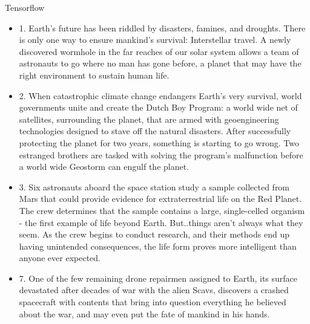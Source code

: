 Tensorflow
\begin{itemize}
    \item 1. Earth's future has been riddled by disasters, famines, and droughts. There is only one way to ensure mankind's survival: Interstellar travel. A newly discovered wormhole in the far reaches of our solar system allows a team of astronauts to go where no man has gone before, a planet that may have the right environment to sustain human life.
    \item 2. When catastrophic climate change endangers Earth's very survival, world governments unite and create the Dutch Boy Program: a world wide net of satellites, surrounding the planet, that are armed with geoengineering technologies designed to stave off the natural disasters. After successfully protecting the planet for two years, something is starting to go wrong. Two estranged brothers are tasked with solving the program's malfunction before a world wide Geostorm can engulf the planet.
    \item 3. Six astronauts aboard the space station study a sample collected from Mars that could provide evidence for extraterrestrial life on the Red Planet. The crew determines that the sample contains a large, single-celled organism - the first example of life beyond Earth. But..things aren't always what they seem. As the crew begins to conduct research, and their methods end up having unintended consequences, the life form proves more intelligent than anyone ever expected.
    \item 7. One of the few remaining drone repairmen assigned to Earth, its surface devastated after decades of war with the alien Scavs, discovers a crashed spacecraft with contents that bring into question everything he believed about the war, and may even put the fate of mankind in his hands.

\end{itemize}
